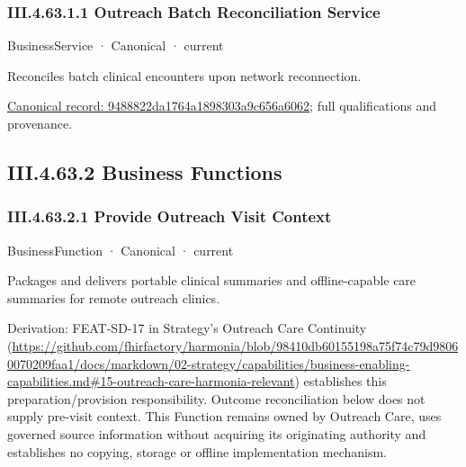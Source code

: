 \subsubsection*{III.4.63.1.1 Outreach Batch Reconciliation Service}
\label{navigation:III.4.63.1.1}

\label{element:9488822da1764a1898303a9c656a6062}
{\small BusinessService · Canonical · current}\par

Reconciles batch clinical encounters upon network reconnection.


{\footnotesize \href{../../../../continuum/business/business-service/9488822da1764a1898303a9c656a6062.md}{Canonical record: 9488822da1764a1898303a9c656a6062}; full qualifications and provenance.}\par
\subsection*{III.4.63.2 Business Functions}
\label{navigation:III.4.63.2}

\subsubsection*{III.4.63.2.1 Provide Outreach Visit Context}
\label{navigation:III.4.63.2.1}

\label{element:4984d2f87f5a46869400c60cd5c5e0ab}
{\small BusinessFunction · Canonical · current}\par

Packages and delivers portable clinical summaries and offline-capable care summaries for remote outreach clinics.



Derivation: FEAT-SD-17 in Strategy's Outreach Care Continuity (\url{https://github.com/fhirfactory/harmonia/blob/98410db60155198a75f74c79d98060070209faa1/docs/markdown/02-strategy/capabilities/business-enabling-capabilities.md#15-outreach-care-harmonia-relevant}) establishes this preparation/provision responsibility. Outcome reconciliation below does not supply pre-visit context. This Function remains owned by Outreach Care, uses governed source information without acquiring its originating authority and establishes no copying, storage or offline implementation mechanism.


